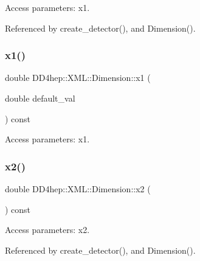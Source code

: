 Access parameters\+: x1. 



Referenced by create\+\_\+detector(), and Dimension().

\hypertarget{struct_d_d4hep_1_1_x_m_l_1_1_dimension_ae83beabaeed3cee7a874dd16e09088fa}{}\label{struct_d_d4hep_1_1_x_m_l_1_1_dimension_ae83beabaeed3cee7a874dd16e09088fa} 
\subsubsection{\texorpdfstring{x1()}{x1()}\hspace{0.1cm}{\footnotesize\ttfamily [2/2]}}
{\footnotesize\ttfamily double D\+D4hep\+::\+X\+M\+L\+::\+Dimension\+::x1 (\begin{DoxyParamCaption}\item[{double}]{default\+\_\+val }\end{DoxyParamCaption}) const}



Access parameters\+: x1. 

\hypertarget{struct_d_d4hep_1_1_x_m_l_1_1_dimension_a51f12fbb1b0f24e738c7ff62009ad93b}{}\label{struct_d_d4hep_1_1_x_m_l_1_1_dimension_a51f12fbb1b0f24e738c7ff62009ad93b} 
\subsubsection{\texorpdfstring{x2()}{x2()}\hspace{0.1cm}{\footnotesize\ttfamily [1/2]}}
{\footnotesize\ttfamily double D\+D4hep\+::\+X\+M\+L\+::\+Dimension\+::x2 (\begin{DoxyParamCaption}{ }\end{DoxyParamCaption}) const}



Access parameters\+: x2. 



Referenced by create\+\_\+detector(), and Dimension().

\hypertarget{struct_d_d4hep_1_1_x_m_l_1_1_dimension_a6a546b24047fc608e7cb60e740f1b93f}{}\label{struct_d_d4hep_1_1_x_m_l_1_1_dimension_a6a546b24047fc608e7cb60e740f1b93f} 
